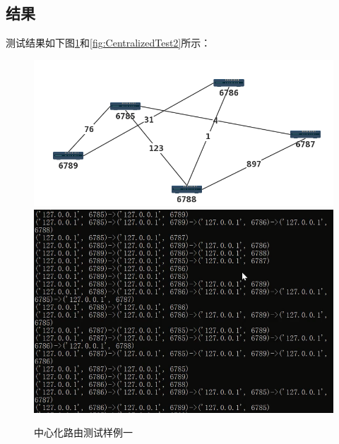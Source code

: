	\subsection{结果} %
	\label{sub:结果}
		测试结果如下图\ref{fig:CentralizedTest1}和\ref{fig:CentralizedTest2}所示：
		\begin{figure}[H]
			\centering
			\includegraphics[scale=0.4]{imgs/topo3/tpop1.png}
			\includegraphics[scale=1]{imgs/cenTest1.PNG}
			\caption{中心化路由测试样例一}
			\label{fig:CentralizedTest1}
		\end{figure}
